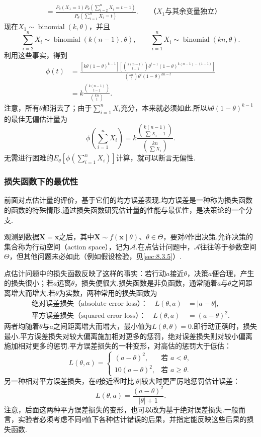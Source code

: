 \begin{example}[二项分布的最佳无偏估计]
\begin{align*}
&=\frac{P_\theta(X_1=1)P_\theta(\sum_{i=2}^nX_i=t-1)}{P_\theta(\sum_{i=1}^nX_i=t)}.&&\text{（$X_1$与其余变量独立）}
\end{align*}
现在$X_1\sim\operatorname{binomial}(k,\theta)$，并且
$$\sum_{i=2}^nX_i\sim\operatorname{binomial}(k(n-1),\theta),\qquad\sum_{i=1}^nX_i\sim\operatorname{binomial}(kn,\theta).$$
利用这些事实，得到
\begin{align*}
\phi(t)&=\frac{[k\theta(1-\theta)^{k-1}]\left[\binom{k(n-1)}{t-1}\theta^{t-1}(1-\theta)^{k(n-1)-(t-1)}\right]}{\binom{kn}t\theta^t(1-\theta)^{kn-t}}\\
&=k\frac{\binom{k(n-1)}{t-1}}{\binom{kn}t}.
\end{align*}
注意，所有$\theta$都消去了；由于$\sum_{i=1}^nX_i$充分，本来就必须如此.所以$k\theta(1-\theta)^{k-1}$的最佳无偏估计量为
$$\phi\left(\sum_{i=1}^nX_i\right)=k\frac{\binom{k(n-1)}{\sum X_i-1}}{\binom{kn}{\sum X_i}}.$$
无需进行困难的$E_\theta[\phi(\sum_{i=1}^nX_i)]$计算，就可以断言无偏性.
\end{example}
\subsubsection{损失函数下的最优性}\label{sec:7.3.4}
前面对点估计量的评价，基于它们的均方误差表现.均方误差是一种称为损失函数的函数的特殊情形.通过损失函数研究估计量的性能与最优性，是决策论的一个分支.

观测到数据$\boldsymbol X=\boldsymbol x$之后，其中$\boldsymbol X\sim f(\boldsymbol x\mid\theta)$、$\theta\in\Theta$，要对$\theta$作出决策.允许决策的集合称为行动空间（action space），记为$\mathcal A$.在点估计问题中，$\mathcal A$往往等于参数空间$\Theta$，但其他问题未必如此（例如假设检验，见\autoref{sec:8.3.5}）.

点估计问题中的损失函数反映了这样的事实：若行动$a$接近$\theta$，决策$a$便合理，产生的损失很小；若$a$远离$\theta$，损失便很大.损失函数是非负函数，通常随着$a$与$\theta$之间距离增大而增大.若$\theta$为实数，两种常用的损失函数为
\begin{align*}
\text{绝对误差损失（absolute error loss）：}\quad L(\theta,a)&=|a-\theta|,\\
\text{平方误差损失（squared error loss）：}\quad L(\theta,a)&=(a-\theta)^2.
\end{align*}
两者均随着$\theta$与$a$之间距离增大而增大，最小值为$L(\theta,\theta)=0$.即行动正确时，损失最小.平方误差损失对较大偏离施加相对更多的惩罚，绝对误差损失则对较小偏离施加相对更多的惩罚.平方误差损失的一种变形，对高估的惩罚大于低估：
$$L(\theta,a)=\begin{cases}(a-\theta)^2,&\text{若 }a<\theta,\\10(a-\theta)^2,&\text{若 }a\ge\theta.\end{cases}$$
另一种相对平方误差损失，在$\theta$接近零时比$|\theta|$较大时更严厉地惩罚估计误差：
$$L(\theta,a)=\frac{(a-\theta)^2}{|\theta|+1}.$$
注意，后面这两种平方误差损失的变形，也可以改为基于绝对误差损失.一般而言，实验者必须考虑不同$\theta$值下各种估计错误的后果，并指定能反映这些后果的损失函数.

